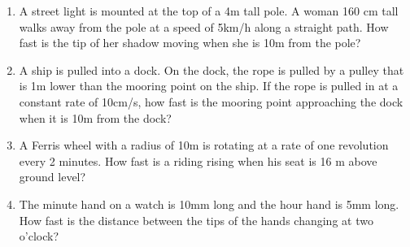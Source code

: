\begin{enumerate}[ref={\fcProblemRef}]
\begin{itemize}
\end{itemize} 

\item 
A street light is mounted at the top of a 4m tall pole. A woman 160 cm tall walks away from the pole at a speed of 5km/h along a straight path. How fast is the tip of her shadow moving when she is 10m from the pole?


\item 
A ship is pulled into a dock. On the dock, the rope is pulled by a pulley that is 1m lower than the mooring point on the ship. If the rope is pulled in at a constant rate of 10cm/s, how fast is the mooring point approaching the dock when it is 10m from the dock?

\item 
A Ferris wheel with a radius of 10m is rotating at a rate of one revolution every 2 minutes. How fast is a riding rising when his seat is 16 m above ground level?

\item \label{problemRelatedRatesWatchHands}
The minute hand on a watch is 10mm long and the hour hand is 5mm long. How fast is the distance between the tips of the hands changing at two o'clock?

\end{enumerate}

